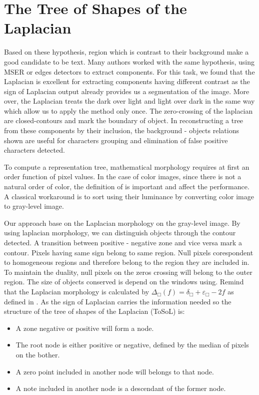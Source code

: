 \section{The Tree of Shapes of the Laplacian}
\par
Based on these hypothesis, region which is contrast to their background make a good candidate to be text. Many authors worked with the same hypothesis, using MSER \cite{Neumann12} \cite{xucheng.2013.pami} \cite{Shi_2013:_MSER} or edges detectors \cite{Liu.2006.CRA} \cite{Yan:2011:Nerocomputing} to extract components. For this task, we found that the Laplacian is excellent for extracting components having different contrast as the sign of Laplacian output already provides us a segmentation of the image. More over, the Laplacian treats the dark over light and light over dark in the same way which allow us to apply the method only once. The zero-crossing of the laplacian are closed-contours and mark the boundary of object. In reconstructing a tree from these components by their inclusion, the background - objects relations shown are useful for characters grouping and elimination of false positive characters detected.
\par
To compute a representation tree, mathematical morphology requires at first an order function of pixel values. In the case of color images, since there is not a natural order of color, the definition of is important and affect the performance. A classical workaround is to sort using their luminance by converting color image to gray-level image. 
\par
Our approach base on the Laplacian morphology on the gray-level image. By using laplacian morphology, we can distinguish objects through the contour detected. A transition between positive - negative zone and vice versa mark a contour. Pixels having same sign belong to same region. Null pixels corespondent to homogeneous regions and therefore belong to the region they are included in. To maintain the duality, null pixels on the zeros crossing will belong to the outer region. The size of objects conserved is depend on the windows using. Remind that the Laplacian morphology is calculated by $ \Delta_\Box (f) = \delta_\Box + \varepsilon_\Box -2f $ as defined in \cite{Vliet_anedge}. As the sign of Laplacian carries the information needed so the structure of the tree of shapes of the Laplacian (ToSoL) is:
\begin{itemize}
\item A zone negative or positive will form a node.
\item The root node is either positive or negative, defined by the median of pixels on the bother.
\item A zero point included in another node will belongs to that node.
\item A note included in another node is a descendant of the former node.
\end{itemize}
